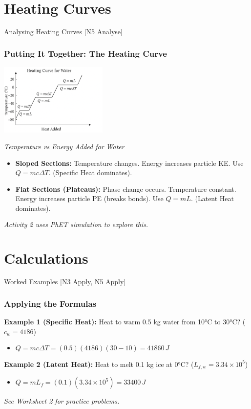 \documentclass[xcolor=svgnames]{beamer}
\begin{document}
\section{Heating Curves}
\begin{frame}{Analysing Heating Curves [N5 Analyse]}
    \frametitle{Putting It Together: The Heating Curve}
    \begin{center}
    \includegraphics[width=0.4\textwidth]{img/water_heating.png}

    \textit{Temperature vs Energy Added for Water}
    \end{center}
    \begin{itemize}
        \item \textbf{Sloped Sections:} Temperature changes. Energy increases particle KE. Use $Q=mc\Delta T$. (Specific Heat dominates).
        \item \textbf{Flat Sections (Plateaus):} Phase change occurs. Temperature constant. Energy increases particle PE (breaks bonds). Use $Q=mL$. (Latent Heat dominates).
    \end{itemize}
    \textit{Activity 2 uses PhET simulation to explore this.}
\end{frame}

\section{Calculations}
\begin{frame}{Worked Examples [N3 Apply, N5 Apply]}
    \frametitle{Applying the Formulas}
    \textbf{Example 1 (Specific Heat):} Heat to warm 0.5 kg water from 10°C to 30°C? ($c_w = 4186$)
    \begin{itemize}
        \item $Q = mc\Delta T = (0.5)(4186)(30-10) = 41860 \, \si{J}$
    \end{itemize}
    \vspace{1em}
    \textbf{Example 2 (Latent Heat):} Heat to melt 0.1 kg ice at 0°C? ($L_{f,w} = 3.34 \times 10^5$)
    \begin{itemize}
        \item $Q = mL_f = (0.1)(3.34 \times 10^5) = 33400 \, \si{J}$
    \end{itemize}
    \vspace{1em}
    \textit{See Worksheet 2 for practice problems.}
\end{frame}
\end{document}
